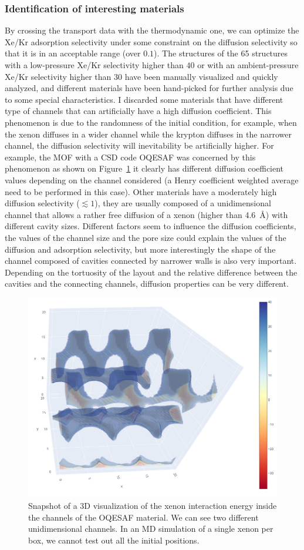 \documentclass[main]{subfiles}
\begin{document}
\subsubsection{Identification of interesting materials}

By crossing the transport data with the thermodynamic one, we can optimize the Xe/Kr adsorption selectivity under some constraint on the diffusion selectivity so that it is in an acceptable range (over $0.1$). The structures of the 65 structures with a low-pressure Xe/Kr selectivity higher than $40$ or with an ambient-pressure Xe/Kr selectivity higher than $30$ have been manually visualized and quickly analyzed, and different materials have been hand-picked for further analysis due to some special characteristics. I discarded some materials that have different type of channels that can artificially have a high diffusion coefficient. This phenomenon is due to the randomness of the initial condition, for example, when the xenon diffuses in a wider channel while the krypton diffuses in the narrower channel, the diffusion selectivity will inevitability be artificially higher. For example, the MOF with a CSD code OQESAF\autocite{Xie_2011} was concerned by this phenomenon as shown on Figure~\ref{fgr:OQESAF} it clearly has different diffusion coefficient values depending on the channel considered (a Henry coefficient weighted average need to be performed in this case). Other materials have a moderately high diffusion selectivity ($\lesssim 1$), they are usually composed of a unidimensional channel that allows a rather free diffusion of a xenon (higher than \SI{4.6}{\angstrom}) with different cavity sizes. Different factors seem to influence the diffusion coefficients, the values of the channel size and the pore size could explain the values of the diffusion and adsorption selectivity, but more interestingly the shape of the channel composed of cavities connected by narrower walls is also very important. Depending on the tortuosity of the layout and the relative difference between the cavities and the connecting channels, diffusion properties can be very different. 

\begin{figure}[ht]
  \centering
    \includegraphics[height=0.4\textwidth]{figures/5-diffusion/viz/OQESAF.jpg}
    \caption{Snapshot of a 3D visualization of the xenon interaction energy inside the channels of the OQESAF\autocite{Xie_2011} material. We can see two different unidimensional channels. In an MD simulation of a single xenon per box, we cannot test out all the initial positions. }\label{fgr:OQESAF}
\end{figure}
\end{document}
